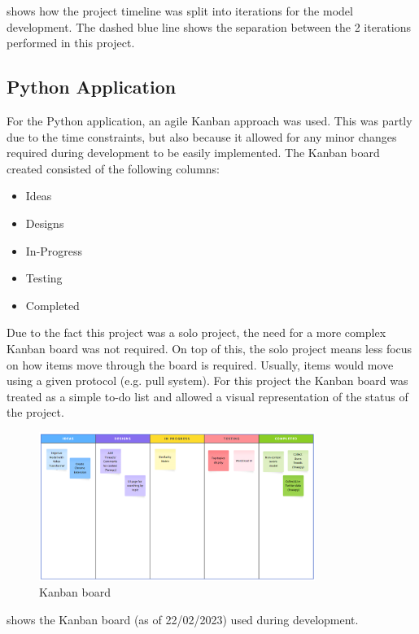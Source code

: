  shows how the project timeline was split into iterations for the model development. The dashed blue line
shows the separation between the 2 iterations performed in this project.
\subsection{Python Application}
For the Python application, an agile Kanban approach was used. This was partly due to the time constraints, but also because it allowed for
any minor changes required during development to be easily implemented. The Kanban board created consisted of the following columns:
\begin{itemize}
    \item Ideas
    \item Designs
    \item In-Progress
    \item Testing
    \item Completed
\end{itemize}
Due to the fact this project was a solo project, the need for a more complex Kanban board was not required. On top of this, the solo project
means less focus on how items move through the board is required. Usually, items would move using a given protocol (e.g. pull system). For this
project the Kanban board was treated as a simple to-do list and allowed a visual representation of the status of the project.
\begin{figure}[hbtp]
    \centering
    \includegraphics[width=0.8\textwidth]{../images/kanban.png}
    \caption{Kanban board}
    \label{fig:kanban}
\end{figure}

 shows the Kanban board (as of 22/02/2023) used during development.

